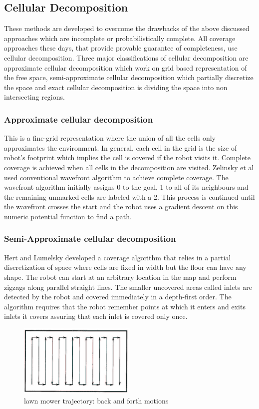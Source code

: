 \subsection{Cellular Decomposition}
These methods are developed to overcome the drawbacks of the above discussed approaches which are incomplete or probabilistically complete. All coverage approaches these days, that provide provable guarantee of completeness, use cellular decomposition\cite{35}. Three major classifications of cellular decomposition are approximate cellular decomposition which work on grid based representation of the free space, semi-approximate cellular decomposition which partially discretize the space and exact cellular decomposition is dividing the space into non intersecting regions.

\subsubsection{Approximate cellular decomposition}
This is a fine-grid representation where the union of all the cells only approximates the environment\cite{35}. In general, each cell in the grid is the size of robot's footprint which implies the cell is covered if the robot visits it. Complete coverage is achieved when all cells in the decomposition are visited. Zelinsky et al\cite{36} used conventional wavefront algorithm to achieve complete coverage. The wavefront algorithm initially assigns 0 to the goal, 1 to all of its neighbours and the remaining unmarked cells are labeled with a 2. This process is continued until the wavefront crosses the start and the robot uses a gradient descent on this numeric potential function\cite{37} to find a path.

\subsubsection{Semi-Approximate cellular decomposition}
Hert and Lumelsky developed a coverage algorithm that relies in a partial discretization of space where cells are fixed in width but the floor can have any shape\cite{38}\cite{39}. The robot can start at an arbitrary location in the map and perform zigzags along parallel straight lines. The smaller uncovered areas called inlets are detected by the robot and covered immediately in a depth-first order. The algorithm requires that the robot remember points at which it enters and exits inlets it covers assuring that each inlet is covered only once. 

\begin{figure}
    \centering
    \includegraphics[width=0.5\textwidth]{images/bostrephroden.png}
    \caption{lawn mower trajectory: back and forth motions}
    \label{fig:my_label}
\end{figure}

